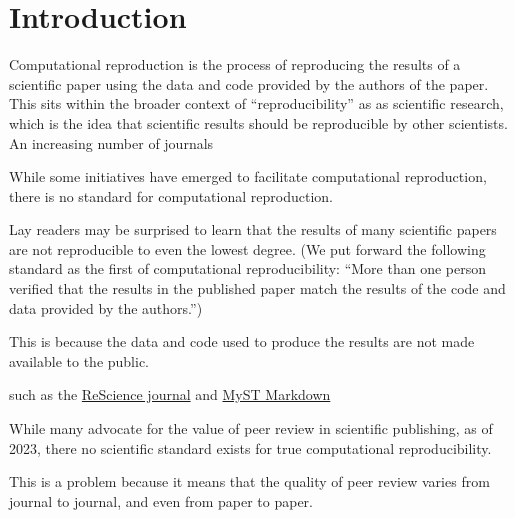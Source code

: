 
\hypertarget{introduction}{%
\section{Introduction}\label{introduction}}

Computational reproduction is the process of reproducing the results of a scientific paper using the data and code provided by the authors of the paper. This sits within the broader context of ``reproducibility'' as as scientific  research, which is the idea that scientific results should be reproducible by other scientists.
 An increasing number of journals 

While some initiatives have emerged to facilitate computational reproduction, there is no standard for computational reproduction. 

Lay readers may be surprised to learn that the results of many scientific papers are not reproducible to even the lowest degree. (We put forward the following standard as the first of computational reproducibility: ``More than one person verified that the results in the published paper match the results of the code and data provided by the authors.'') 

This is because the data and code used to produce the results are not made available to the public. 

such as the \href{https://rescience.github.io/}{ReScience journal} and \href{https://jupyterbook.org/en/stable/content/myst.html}{MyST Markdown}

While many advocate for the value of peer review in scientific publishing, as of 2023, there no scientific standard exists for true computational reproducibility. 

This is a problem because it means that the quality of peer review varies from journal to journal, and even from paper to paper. 
